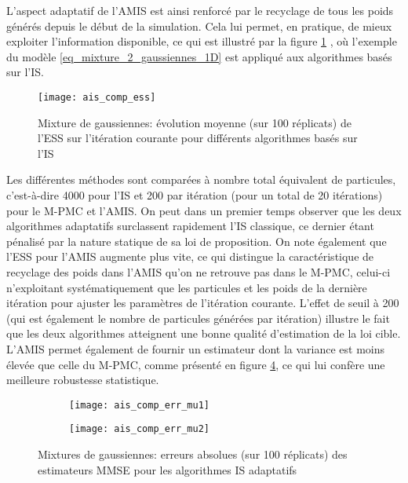 {
	L'aspect adaptatif de l'AMIS est ainsi renforcé par le recyclage de tous les poids générés depuis le début de la simulation. Cela lui permet, en pratique, de mieux exploiter l'information disponible, ce qui est illustré par la figure \ref{fig_ais_comp_ess} , où l'exemple du modèle \ref{eq_mixture_2_gaussiennes_1D} est appliqué aux algorithmes basés sur l'IS.
	
\begin{figure}[h!]
	\centering
	\texttt{[image: ais\_comp\_ess]}
	\caption{Mixture de gaussiennes: évolution moyenne (sur 100 réplicats) de l'ESS sur l'itération courante pour différents algorithmes basés sur l'IS}
	\label{fig_ais_comp_ess}
\end{figure}

Les différentes méthodes sont comparées à nombre total équivalent de particules, c'est-à-dire 4000 pour l'IS et 200 par itération (pour un total de 20 itérations) pour le M-PMC et l'AMIS. On peut dans un premier temps observer que les deux algorithmes adaptatifs surclassent rapidement l'IS classique, ce dernier étant pénalisé par la nature statique de sa loi de proposition. On note également que l'ESS pour l'AMIS augmente plus vite, ce qui distingue la caractéristique de recyclage des poids dans l'AMIS qu'on ne retrouve pas dans le M-PMC, celui-ci n'exploitant systématiquement que les particules et les poids de la dernière itération pour ajuster les paramètres de l'itération courante. L'effet de seuil à 200 (qui est également le nombre de particules générées par itération) illustre le fait que les deux algorithmes atteignent une bonne qualité d'estimation de la loi cible.\\

L'AMIS permet également de fournir un estimateur dont la variance est moins élevée que celle du M-PMC, comme présenté en figure \ref{fig_ais_comp_err}, ce qui lui confère une meilleure robustesse statistique. 

\begin{figure}[h!]
	\centering
	\begin{subfigure}[t]{0.5\textwidth}
		\centering
		\texttt{[image: ais\_comp\_err\_mu1]}
		\caption{}
		\label{ais_comp_mu1}
	\end{subfigure}%
	\begin{subfigure}[t]{0.5\textwidth}
		\centering
		\texttt{[image: ais\_comp\_err\_mu2]}
		\caption{}
		\label{ais_comp_mu2}
	\end{subfigure}
	\caption{Mixtures de gaussiennes: erreurs absolues (sur 100 réplicats) des estimateurs MMSE pour les algorithmes IS adaptatifs} 
	\label{fig_ais_comp_err}
\end{figure}
}

